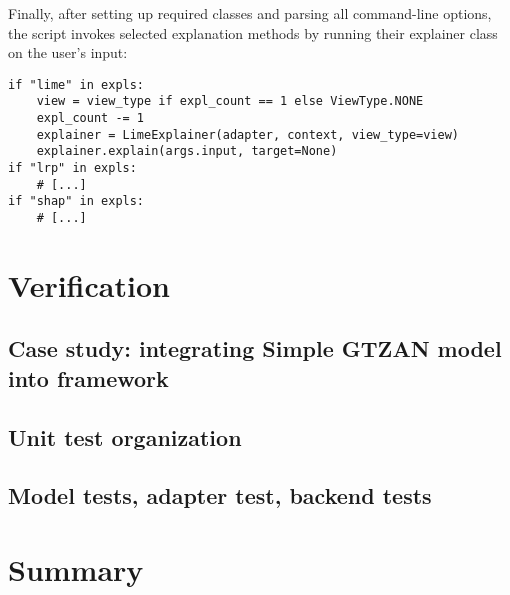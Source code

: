 \documentclass[
    bindingoffset=5mm,  %
    footnoteindent=3mm, %
    hyphenation=true    %
]{src/wut-thesis}
\begin{document}
Finally, after setting up required classes and parsing all command-line options,
the script invokes selected explanation methods by running their
explainer class on the user’s input:

\begin{verbatim}
if "lime" in expls:
    view = view_type if expl_count == 1 else ViewType.NONE
    expl_count -= 1
    explainer = LimeExplainer(adapter, context, view_type=view)
    explainer.explain(args.input, target=None)
if "lrp" in expls:
    # [...]
if "shap" in expls:
    # [...]
\end{verbatim}

%
%
\clearpage %
\section{Verification} \label{ch:verification}

\subsection{Case study: integrating Simple GTZAN model into framework}
\subsection{Unit test organization}
\subsection{Model tests, adapter test, backend tests}

%
%
\clearpage %
\section{Summary} \label{ch:summary}

\cleardoublepage %
\printbibliography
\clearpage

\acronymlist
{}
\vspace{0.8cm}
\end{document}
